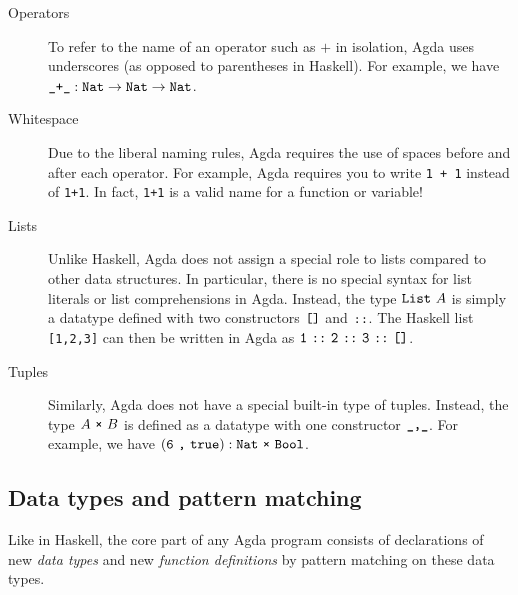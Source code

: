 \documentclass[a4paper,UKenglish]{tufte-handout}
\theoremstyle{definition}
\newcommand\fun[1]{{\AgdaFunction{#1}}}
\newcommand\data[1]{{\AgdaFunction{#1}}}
\newcommand\con[1]{{\AgdaInductiveConstructor{#1}}}
\newcommand\lit[1]{{\AgdaNumber{#1}}}
\newcommand\Nat{\data{Nat}}
\newcommand\Bool{\data{Bool}}
\newcommand\true{\con{true}}
\newcommand\nil{\con{[]}}
\newcommand\cons{\con{::}}
\begin{document}
\begin{description}
\item[Operators] To refer to the name of an operator such as $+$ in isolation,
Agda uses underscores (as opposed to parentheses in Haskell). For example, we
have $\fun{\_+\_} : \Nat \to \Nat \to \Nat$.

\item[Whitespace] Due to the liberal naming rules, Agda requires the use of
spaces before and after each operator. For example, Agda requires you to write
\texttt{1\ +\ 1} instead of \texttt{1+1}. In fact, \texttt{1+1} is a valid name
for a function or variable!

\item[Lists] Unlike Haskell, Agda does not assign a special role to lists
compared to other data structures. In particular, there is no special syntax
for list literals or list comprehensions in Agda. Instead, the type
$\data{List}\ A$ is simply a datatype defined with two constructors $\nil$
and $\cons$. The Haskell list \texttt{[1,2,3]} can then be written in
Agda as $\lit{1}\ \cons\ \lit{2}\ \cons\ \lit{3}\ \cons\ \nil$.

\item[Tuples] Similarly, Agda does not have a special built-in type of
tuples.  Instead, the type $A\ \data{×}\ B$ is defined as a datatype
with one constructor $\con{\_,\_}$. For example, we have $(\lit{6}\
\con{,}\ \true) : \Nat\ \data{×}\ \Bool$.


\end{description}

\subsection{Data types and pattern matching}

Like in Haskell, the core part of any Agda program consists of declarations of
new \emph{data types} and new \emph{function definitions} by pattern
matching on these data types.
\end{document}
